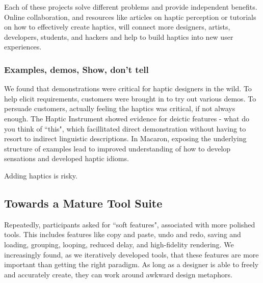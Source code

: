     Each of these projects solve different problems and provide independent benefits.
    Online collaboration, and resources like articles on haptic perception or tutorials on how to effectively create haptics, will connect more designers, artists, developers, students, and hackers and help to build haptics into new user experiences.


\subsubsection{Examples, demos, Show, don't tell}
We found that demonstrations were critical for haptic designers in the wild.
To help elicit requirements, customers were brought in to try out various demos.
To persuade customers, actually feeling the haptics was critical, if not always enough.
The Haptic Instrument showed evidence for deictic features - what do you think of ``this", which facillitated direct demonstration without having to resort to indirect linguistic descriptions.
In Macaron, exposing the underlying structure of examples lead to improved understanding of how to develop sensations and developed haptic idioms.





Adding haptics is risky.




%
%
\subsection{Towards a Mature \haxd Tool Suite}



Repeatedly, participants asked for ``soft features", associated with more polished tools.
This includes features like copy and paste, undo and redo, saving and loading, grouping, looping, reduced delay, and high-fidelity rendering.
We increasingly found, as we iteratively developed \haxd tools, that these features are more important than getting the right paradigm.
As long as a designer is able to freely and accurately create, they can work around awkward design metaphors.

